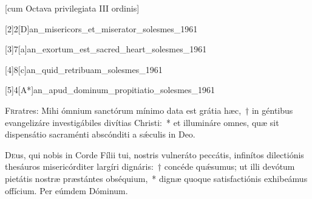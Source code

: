 \documentclass[vesperale_romanum.tex]{subfiles}
\begin{document}
 [cum Octava privilegiata III ordinis]
 \thispagestyle{empty}

  \label{i_vesperis_sc}
\zerobaroffsettextleft
 \resetbaroffsettextleft
{}
 
 [2]{2}[D]{an_misericors_et_miserator_solesmes_1961}
 
 
 
 
  [3]{7}[a]{an_exortum_est_sacred_heart_solesmes_1961}
  
   [4]{8}[c]{an_quid_retribuam_solesmes_1961}
   
    [5]{4}[A*]{an_apud_dominum_propitiatio_solesmes_1961}
    
    \label{cap_sc}
{}

\lettrine{F}{r}ratres: Mihi ó\-mnium san\-ctórum mínimo data est grátia hæc,~† in géntibus evangelizáre investigábiles divítias Christi:~* et illumináre omnes, quæ sit dispensátio sacraménti abscónditi a sǽculis in Deo.

\hymnus \label{hy_en_ut_superba}
   
   
   \label{Tollite}
   
    
 \label{Ignem}
 
\oratio \label{oratio_sc}

\lettrine{D}{e}us, qui nobis in Corde Fílii tui, nostris vulneráto peccátis, infinítos dilectiónis thesáuros misericórditer largíri dignáris:~† concéde quǽsumus; ut illi devótum pietátis nostræ præstántes obséquium,~* dignæ quoque satisfactiónis exhibeámus offícium. Per eúmdem Dóminum.
 
\end{document}
